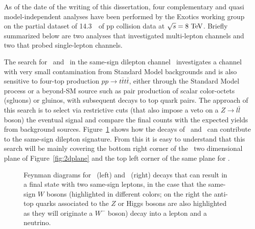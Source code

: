 As of the date of the writing of this dissertation, four complementary 
and quasi model-independent analyses have been performed by the Exotics working
group on the partial dataset of 14.3~\ifb\ of pp collision data at 
$\sqrt{s}=8\tev$.  Briefly summarized below are
two analyses that investigated multi-lepton channels and two that probed 
single-lepton channels.

The search for \BB\ and \TT\ in the same-sign 
dilepton channel~\cite{ATLAS-CONF-2013-051}
investigates a channel
with very small contamination from Standard Model backgrounds and
is also sensitive to four-top production $pp\to t\bar{t}t\bar{t}$, 
either through the Standard Model process or a beyond-SM source such as 
pair production of scalar color-octets (sgluons) or gluinos, with subsequent 
decays to top quark pairs.
The approach of this search is to select via restrictive cuts (that also
impose a veto on a $Z\to l\bar{l}$ boson) the eventual signal
and compare the final counts with the expected yields from background sources.
Figure~\ref{fig:feyndSS} shows how the decays of \BB\ and \TT\ 
can contribute to the same-sign dilepton signature. From this it is easy to
understand that this search will be mainly covering the bottom right corner
of the \BBbar\ two dimensional plane of Figure~\ref{fig:2dplane} and the top 
left corner of the same plane for \TTbar.

\begin{figure}[hbt]
\begin{center}
        \myskip\myskip
	\caption{Feynman diagrams for \BBbar\ (left) and \TTbar\ (right)
        decays that can result in a final state with two same-sign leptons,
        in the case that the same-sign $W$ bosons (highlighted in different colors;
        on the right the anti-top quarks associated to the $Z$ or Higgs bosons are
        also highlighted as they will originate a $W^{-}$ boson) decay
        into a lepton and a neutrino. \label{fig:feyndSS}}
\end{center}
\end{figure}


